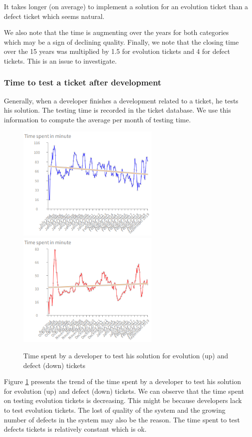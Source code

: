 \documentclass[10pt,conference]{IEEEtran}
\begin{document}
It takes longer (on average) to implement a solution for an evolution ticket than a defect ticket which seems natural.

We also note that the time is augmenting over the years for both categories which may be a sign of declining quality.
Finally, we note that the closing time over the 15 years was multiplied by 1.5 for evolution tickets and 4 for defect tickets.
This is an issue to investigate.
\subsubsection{Time  to test a ticket after development}

Generally, when a developer finishes a development related to a ticket, he tests his solution.  
The testing time is recorded in the ticket database.
 We use this information to compute the average per month of testing time. 


 \begin{figure}[htbp]
  \centering
  \includegraphics[width=70mm]{./images/evolutionTest.png} \\
  \includegraphics[width=70mm]{./images/timeDevTest.png}
  \caption{Time spent by a developer to test his solution for  evolution (up) and defect (down) tickets}
  \label{fig:devTimeTest}
\end{figure}
Figure \ref{fig:devTimeTest} presents the trend of the time spent by a developer to test his solution for evolution (up) and defect (down) tickets.
We can observe that the time spent on testing evolution tickets is decreasing. 
This might be because developers lack to test evolution tickets. The lost of quality of the system and the growing number of defects in the system may also be the reason.
The time spent to test defects tickets is relatively constant which is ok.
 
\end{document}
